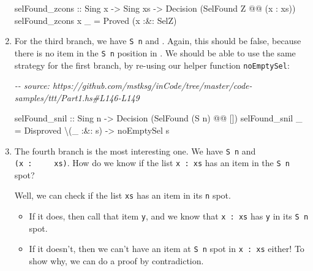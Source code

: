 \documentclass[]{article}
\newenvironment{Shaded}{}{}
\newcommand{\CommentTok}[1]{\textcolor[rgb]{0.38,0.63,0.69}{\textit{#1}}}
\newcommand{\DataTypeTok}[1]{\textcolor[rgb]{0.56,0.13,0.00}{#1}}
\newcommand{\NormalTok}[1]{#1}
\newcommand{\OperatorTok}[1]{\textcolor[rgb]{0.40,0.40,0.40}{#1}}
\newcommand{\OtherTok}[1]{\textcolor[rgb]{0.00,0.44,0.13}{#1}}
\begin{document}
\begin{enumerate}
\begin{Shaded}
\begin{Highlighting}[]
\NormalTok{selFound\_zcons}
\OtherTok{    ::} \DataTypeTok{Sing}\NormalTok{ x}
    \OtherTok{{-}\textgreater{}} \DataTypeTok{Sing}\NormalTok{ xs}
    \OtherTok{{-}\textgreater{}} \DataTypeTok{Decision}\NormalTok{ (}\DataTypeTok{SelFound} \DataTypeTok{\textquotesingle{}Z} \OperatorTok{@@}\NormalTok{ (x \textquotesingle{}}\OperatorTok{:}\NormalTok{ xs))}
\NormalTok{selFound\_zcons x \_ }\OtherTok{=} \DataTypeTok{Proved}\NormalTok{ (x }\OperatorTok{:\&:} \DataTypeTok{SelZ}\NormalTok{)}
\end{Highlighting}
\end{Shaded}
\item
  For the third branch, we have \texttt{\textquotesingle{}S\ n} and
  \texttt{\textquotesingle{}{[}{]}}. Again, this should be false, because there
  is no item in the \texttt{\textquotesingle{}S\ n} position in
  \texttt{\textquotesingle{}{[}{]}}. We should be able to use the same strategy
  for the first branch, by re-using our helper function \texttt{noEmptySel}:

\begin{Shaded}
\begin{Highlighting}[]
\CommentTok{{-}{-} source: https://github.com/mstksg/inCode/tree/master/code{-}samples/ttt/Part1.hs\#L146{-}L149}

\NormalTok{selFound\_snil}
\OtherTok{    ::} \DataTypeTok{Sing}\NormalTok{ n}
    \OtherTok{{-}\textgreater{}} \DataTypeTok{Decision}\NormalTok{ (}\DataTypeTok{SelFound}\NormalTok{ (}\DataTypeTok{\textquotesingle{}S}\NormalTok{ n) }\OperatorTok{@@}\NormalTok{ \textquotesingle{}[])}
\NormalTok{selFound\_snil \_ }\OtherTok{=} \DataTypeTok{Disproved}\NormalTok{ \textbackslash{}(\_ }\OperatorTok{:\&:}\NormalTok{ s) }\OtherTok{{-}\textgreater{}}\NormalTok{ noEmptySel s}
\end{Highlighting}
\end{Shaded}
\item
  The fourth branch is the most interesting one. We have
  \texttt{\textquotesingle{}S\ n} and
  \texttt{(x\ \textquotesingle{}:\ \ \ \ \ xs)}. How do we know if the list
  \texttt{x\ \textquotesingle{}:\ xs} has an item in the
  \texttt{\textquotesingle{}S\ n} spot?

  Well, we can check if the list \texttt{xs} has an item in its \texttt{n} spot.

  \begin{itemize}
  \item
    If it does, then call that item \texttt{y}, and we know that
    \texttt{x\ \textquotesingle{}:\ xs} has \texttt{y} in its
    \texttt{\textquotesingle{}S\ n} spot.
  \item
    If it doesn't, then we can't have an item at \texttt{\textquotesingle{}S\ n}
    spot in \texttt{x\ \textquotesingle{}:\ xs} either! To show why, we can do a
    proof by contradiction.


\end{itemize}
\end{enumerate}
\end{document}
